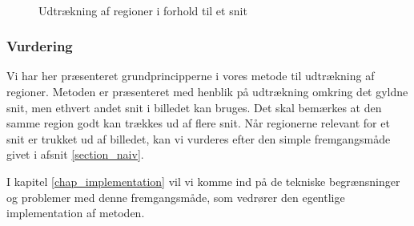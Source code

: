 {\begin{figure}[!h]
{        \label{sammen_floodfill}}\\
    \caption[]{Udtrækning af regioner i forhold til et snit}
    \label{sammensaetning}
\end{figure}

\subsubsection{Vurdering}
Vi har her præsenteret grundprincipperne i vores metode til udtrækning
af regioner. Metoden er præsenteret med henblik på udtrækning omkring
det gyldne snit, men ethvert andet snit i billedet kan bruges. Det skal
bemærkes at den samme region godt kan trækkes ud af flere snit. Når
regionerne relevant for et snit er trukket ud af billedet, kan vi
vurderes efter den simple fremgangsmåde givet i afsnit
\ref{section_naiv}.

I kapitel \ref{chap_implementation} vil vi komme ind på de tekniske
begrænsninger og problemer med denne fremgangsmåde, som vedrører den
egentlige implementation af metoden.

}

